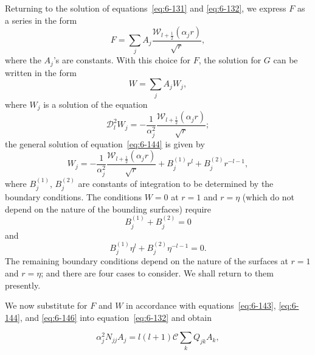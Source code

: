 Returning to the solution of equations~\eqref{eq:6-131} and \eqref{eq:6-132}, we express $F$
as a series in the form
\begin{equation}\label{eq:6-143}
F = \sum_j A_j\frac{\mathscr{W}_{l+\frac{1}{2}}(\alpha_j r)}{\sqrt{r}},
\end{equation}
where the $A_j$'s are constants. With this choice for $F$, the solution for $G$
can be written in the form
\begin{equation}\label{eq:6-144}
W = \sum_j A_j W_j,
\end{equation}
where $W_j$ is a solution of the equation
\begin{equation}\label{eq:6-145}
\mathscr{D}_l^2 W_j = -\frac{1}{\alpha_j^2}\frac{\mathscr{W}_{l+\frac{1}{2}}(\alpha_j r)}{\sqrt{r}};
\end{equation}
the general solution of equation~\eqref{eq:6-144} is given by
\begin{equation}\label{eq:6-146}
W_j = -\frac{1}{\alpha_j^2}\frac{\mathscr{W}_{l+\frac{1}{2}}(\alpha_j r)}{\sqrt{r}} + B_j^{(1)} r^l + B_j^{(2)} r^{-l-1},
\end{equation}
where $B_j^{(1)}$, $B_j^{(2)}$ are constants of integration to be determined by the
boundary conditions. The conditions $W = 0$ at $r = 1$ and $r = \eta$
(which do not depend on the nature of the bounding surfaces) require
\begin{equation}\label{eq:6-147}
B_j^{(1)} + B_j^{(2)} = 0
\end{equation}
and
\begin{equation}\label{eq:6-148}
B_j^{(1)}\eta^l + B_j^{(2)}\eta^{-l-1} = 0.
\end{equation}
The remaining boundary conditions depend on the nature of the surfaces
at $r = 1$ and $r = \eta$; and there are four cases to consider. We shall return
to them presently.

We now substitute for $F$ and $W$ in accordance with
equations~\eqref{eq:6-143}, \eqref{eq:6-144}, and \eqref{eq:6-146} into equation~\eqref{eq:6-132} and obtain

\begin{equation}\label{eq:6-149}
\alpha_j^2 N_{jj} A_j = l(l+1)\mathcal{C}\sum_k Q_{jk} A_k,
\end{equation}


